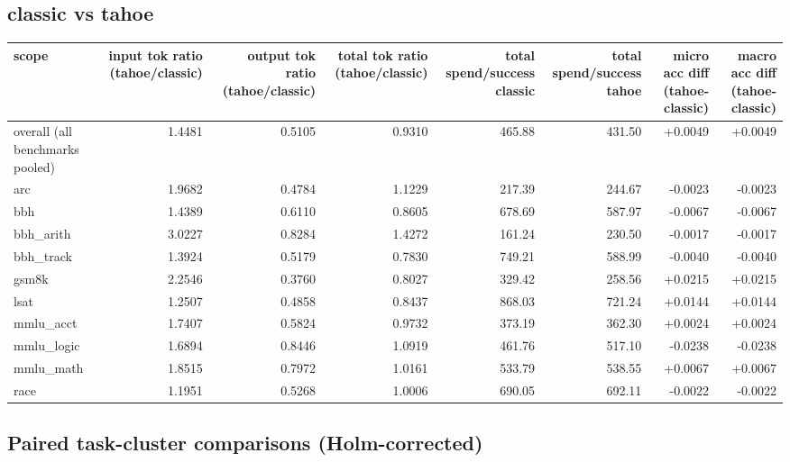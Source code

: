 \documentclass[11pt,a4paper]{article}
\begin{document}
\subsection*{classic vs tahoe}

\begin{tabular}{@{}l r r r r r r r@{}}
\toprule
scope & input tok ratio (tahoe/classic) & output tok ratio (tahoe/classic) & total tok ratio (tahoe/classic) & total spend/success classic & total spend/success tahoe & micro acc diff (tahoe-classic) & macro acc diff (tahoe-classic) \\
\midrule
overall (all benchmarks pooled) & 1.4481 & 0.5105 & 0.9310 & 465.88 & 431.50 & +0.0049 & +0.0049 \\
arc & 1.9682 & 0.4784 & 1.1229 & 217.39 & 244.67 & -0.0023 & -0.0023 \\
bbh & 1.4389 & 0.6110 & 0.8605 & 678.69 & 587.97 & -0.0067 & -0.0067 \\
bbh\_arith & 3.0227 & 0.8284 & 1.4272 & 161.24 & 230.50 & -0.0017 & -0.0017 \\
bbh\_track & 1.3924 & 0.5179 & 0.7830 & 749.21 & 588.99 & -0.0040 & -0.0040 \\
gsm8k & 2.2546 & 0.3760 & 0.8027 & 329.42 & 258.56 & +0.0215 & +0.0215 \\
lsat & 1.2507 & 0.4858 & 0.8437 & 868.03 & 721.24 & +0.0144 & +0.0144 \\
mmlu\_acct & 1.7407 & 0.5824 & 0.9732 & 373.19 & 362.30 & +0.0024 & +0.0024 \\
mmlu\_logic & 1.6894 & 0.8446 & 1.0919 & 461.76 & 517.10 & -0.0238 & -0.0238 \\
mmlu\_math & 1.8515 & 0.7972 & 1.0161 & 533.79 & 538.55 & +0.0067 & +0.0067 \\
race & 1.1951 & 0.5268 & 1.0006 & 690.05 & 692.11 & -0.0022 & -0.0022 \\
\bottomrule
\end{tabular}

\subsection*{Paired task-cluster comparisons (Holm-corrected)}
\end{document}

